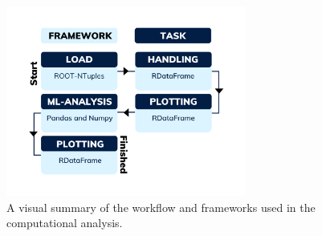 \begin{figure}
  \centering
  \includegraphics[width=0.7\textwidth]{Figures/Illustrations/TaskFlow.png}
  \vspace{-1cm}
  \caption{A visual summary of the workflow and frameworks used in the 
  computational analysis. }
  \label{fig:WF}
\end{figure}

